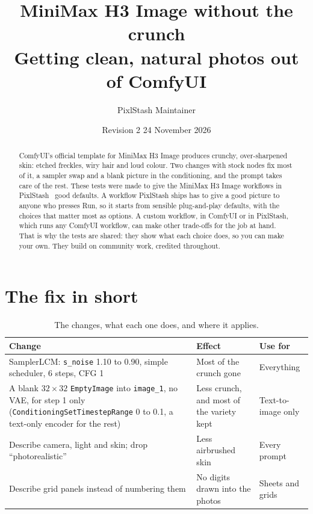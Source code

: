 \documentclass[11pt,a4paper]{article}
\title{\textbf{MiniMax H3 Image without the crunch}\\[0.4em]
  \large Getting clean, natural photos out of ComfyUI}
\author{PixlStash Maintainer}
\date{Revision 2 \textperiodcentered{} 24 November 2026}
\begin{document}
\maketitle

\begin{abstract}
\noindent ComfyUI's official template for MiniMax H3 Image produces crunchy, over-sharpened skin: etched freckles, wiry hair and loud colour. Two changes with stock nodes fix most of it, a sampler swap and a blank picture in the conditioning, and the prompt takes care of the rest. These tests were made to give the MiniMax H3 Image workflows in PixlStash~\cite{pixlstash} good defaults. A workflow PixlStash ships has to give a good picture to anyone who presses Run, so it starts from sensible plug-and-play defaults, with the choices that matter most as options. A custom workflow, in ComfyUI or in PixlStash, which runs any ComfyUI workflow, can make other trade-offs for the job at hand. That is why the tests are shared: they show what each choice does, so you can make your own. They build on community work, credited throughout.
\end{abstract}

\section{The fix in short}

\begin{table}[H]
\centering
\small
\begin{tabularx}{\linewidth}{L L l}
\toprule
\textbf{Change} & \textbf{Effect} & \textbf{Use for} \\
\midrule
SamplerLCM: \texttt{s\_noise} 1.10 to 0.90, simple scheduler, 6 steps, CFG 1 & Most of the crunch gone & Everything \\
A blank $32\times32$ \texttt{EmptyImage} into \texttt{image\_1}, no VAE, for step 1 only (\texttt{ConditioningSetTimestepRange} 0 to 0.1, a text-only encoder for the rest) & Less crunch, and most of the variety kept & Text-to-image only \\
Describe camera, light and skin; drop ``photorealistic'' & Less airbrushed skin & Every prompt \\
Describe grid panels instead of numbering them & No digits drawn into the photos & Sheets and grids \\
\bottomrule
\end{tabularx}
\caption{The changes, what each one does, and where it applies.}
\end{table}
\end{document}
